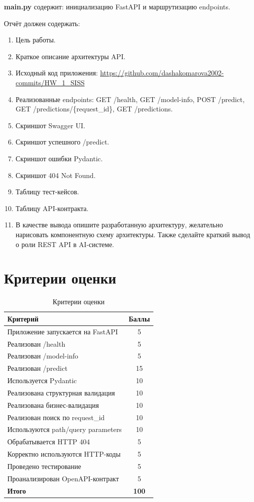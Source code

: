 \documentclass[12pt,a4paper]{article}
\begin{document}
\textbf{main.py} содержит: инициализацию FastAPI и маршрутизацию endpoints.

Отчёт должен содержать:

\begin{enumerate}
    \item Цель работы.
    \item Краткое описание архитектуры API.
    \item Исходный код приложения: \url{https://github.com/dashakomarova2002-commits/HW_1_SISS}
    \item Реализованные endpoints: GET /health, GET /model-info, POST /predict, GET /predictions/\{request\_id\}, GET /predictions.
    \item Скриншот Swagger UI.
    \item Скриншот успешного /predict.
    \item Скриншот ошибки Pydantic.
    \item Скриншот 404 Not Found.
    \item Таблицу тест-кейсов.
    \item Таблицу API-контракта.
    \item В качестве вывода опишите разработанную архитектуру, желательно нарисовать компонентную схему архитектуры. Также сделайте краткий вывод о роли REST API в AI-системе.
\end{enumerate}

\section{Критерии оценки}

\begin{table}[H]
\centering
\caption{Критерии оценки}
\label{tab:criteria}
\begin{tabular}{|p{10cm}|c|}
\hline
\textbf{Критерий} & \textbf{Баллы} \\
\hline
Приложение запускается на FastAPI & 5 \\
Реализован /health & 5 \\
Реализован /model-info & 5 \\
Реализован /predict & 15 \\
Используется Pydantic & 10 \\
Реализована структурная валидация & 10 \\
Реализована бизнес-валидация & 10 \\
Реализован поиск по request\_id & 10 \\
Используются path/query parameters & 10 \\
Обрабатывается HTTP 404 & 5 \\
Корректно используются HTTP-коды & 5 \\
Проведено тестирование & 5 \\
Проанализирован OpenAPI-контракт & 5 \\
\hline
\textbf{Итого} & \textbf{100} \\
\hline
\end{tabular}
\end{table}
\end{document}
